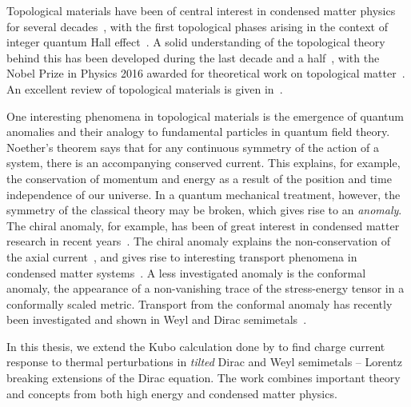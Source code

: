%
Topological materials have been of central interest in condensed matter physics for several decades~\cite{fruchartIntroductionTopologicalInsulators2013}, with the first topological phases arising in the context of integer quantum Hall effect~\cites{klitzingNewMethodHighAccuracy1980}[as cited in][]{fruchartIntroductionTopologicalInsulators2013}.
A solid understanding of the topological theory behind this has been developed during the last decade and a half~\cite{fruchartIntroductionTopologicalInsulators2013, bernevigTopologicalInsulatorsTopological2013}, with the Nobel Prize in Physics 2016 awarded for theoretical work on topological matter~\cite{NobelPrizePhysics}.
An excellent review of topological materials is given in~\cite{fruchartIntroductionTopologicalInsulators2013}.

One interesting phenomena in topological materials is the emergence of quantum anomalies and their analogy to fundamental particles in quantum field theory.
Noether's theorem says that for any continuous symmetry of the action of a system, there is an accompanying conserved current.
This explains, for example, the conservation of momentum and energy as a result of the position and time independence of our universe.
In a quantum mechanical treatment, however, the symmetry of the classical theory may be broken, which gives rise to an \emph{anomaly}.
The chiral anomaly, for example, has been of great interest in condensed matter research in recent years~\cite{arjonaFingerprintsConformalAnomaly2019}.
The chiral anomaly explains the non-conservation of the axial current~\cite{zeeQuantumFieldTheory2010}, and gives rise to interesting transport phenomena in condensed matter systems~\cite{burkovChiralAnomalyTransport2015, wehlingDiracMaterials2014, burkovTopologicalSemimetals2016}.
A less investigated anomaly is the conformal anomaly, the appearance of a non-vanishing trace of the stress-energy tensor in a conformally scaled metric.
Transport from the conformal anomaly has recently been investigated and shown in Weyl and Dirac semimetals~\cite{chernodubAnomalousTransportDue2016, chernodubGenerationNernstCurrent2018, arjonaFingerprintsConformalAnomaly2019}.

In this thesis, we extend the Kubo calculation done by \textcite{arjonaFingerprintsConformalAnomaly2019} to find charge current response to thermal perturbations in \emph{tilted} Dirac and Weyl semimetals -- Lorentz breaking extensions of the Dirac equation.
The work combines important theory and concepts from both high energy and condensed matter physics.

